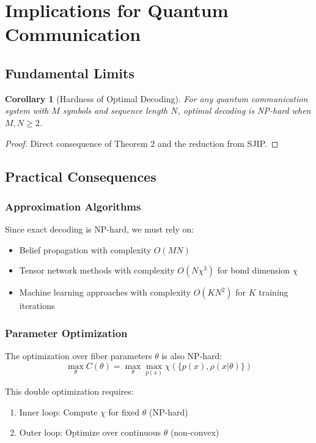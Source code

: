 \documentclass[12pt,a4paper]{article}
\newtheorem{corollary}[theorem]{Corollary}
\begin{document}
\section{Implications for Quantum Communication}

\subsection{Fundamental Limits}

\begin{corollary}[Hardness of Optimal Decoding]
For any quantum communication system with $M$ symbols and sequence length $N$, optimal decoding is NP-hard when $M, N \geq 2$.
\end{corollary}

\begin{proof}
Direct consequence of Theorem 2 and the reduction from SJIP.
\end{proof}

\subsection{Practical Consequences}

\subsubsection{Approximation Algorithms}
Since exact decoding is NP-hard, we must rely on:
\begin{itemize}
\item Belief propagation with complexity $O(MN)$
\item Tensor network methods with complexity $O(N\chi^3)$ for bond dimension $\chi$
\item Machine learning approaches with complexity $O(KN^2)$ for $K$ training iterations
\end{itemize}

\subsubsection{Parameter Optimization}
The optimization over fiber parameters $\theta$ is also NP-hard:
\begin{equation}
\max_{\theta} C(\theta) = \max_{\theta} \max_{p(x)} \chi(\{p(x), \rho(x|\theta)\})
\end{equation}

This double optimization requires:
\begin{enumerate}
\item Inner loop: Compute $\chi$ for fixed $\theta$ (NP-hard)
\item Outer loop: Optimize over continuous $\theta$ (non-convex)
\end{enumerate}
\end{document}
